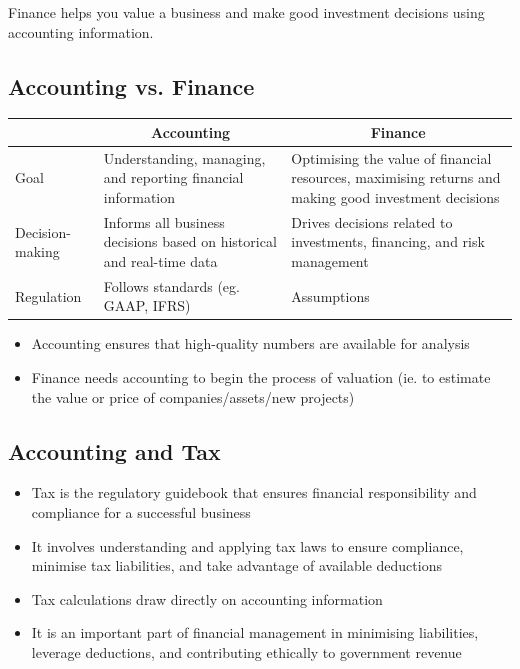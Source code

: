 \documentclass{article}
\begin{document}
		Finance helps you value a business and make good investment decisions using accounting information.

	\subsection{Accounting vs. Finance}
		\begin{table}[H]
			\begin{center}
				\begin{tabular}[c]{p{4cm}|p{6cm}|p{6cm}}
					\hline
					\multicolumn{1}{c|}{\textbf{ }} & 
					\multicolumn{1}{c|}{\textbf{Accounting}} & 
					\multicolumn{1}{c}{\textbf{Finance}} \\
					\hline
					Goal			& Understanding, managing, and reporting financial information & Optimising the value of financial resources, maximising returns and making good investment decisions\\
					Decision-making & Informs all business decisions based on historical and real-time data	& Drives decisions related to investments, financing, and risk management \\
					Regulation		& Follows standards (eg. GAAP, IFRS)	& Assumptions \\
					
					\hline
				\end{tabular}
			\end{center}
		\end{table}
		
		\begin{itemize}
			\item Accounting ensures that high-quality numbers are available for analysis
			\item Finance needs accounting to begin the process of \colorbox{pastel_green}{valuation} (ie. to estimate the value or price of companies/assets/new projects)
		\end{itemize}

	\subsection{Accounting and Tax}
		\begin{itemize}
			\item Tax is the regulatory guidebook that ensures financial responsibility and compliance for a successful business
			\item It involves understanding and applying tax laws to ensure compliance, minimise tax liabilities, and take advantage of available deductions
			\item Tax calculations draw directly on accounting information
			\item It is an important part of financial management in minimising liabilities, leverage deductions, and contributing ethically to government revenue
		\end{itemize}
\end{document}
